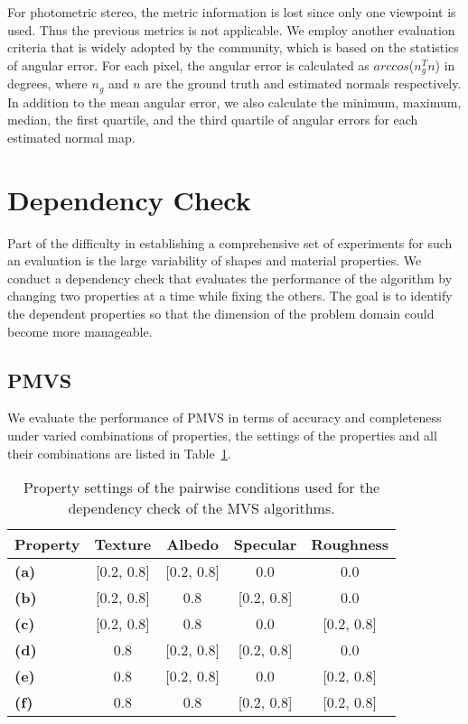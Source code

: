 For photometric stereo, the metric information is lost since only one viewpoint is used. Thus the previous metrics is not applicable. We employ another evaluation criteria that is widely adopted by the community, which is based on the statistics of angular error. For each pixel, the angular error is calculated as $arccos$($n_g^T n$) in degrees, where $n_g$ and $n$ are the ground truth and estimated normals respectively. In addition to the mean angular error, we also calculate the minimum, maximum, median, the first quartile, and the third quartile of angular errors for each estimated normal map.

\section{Dependency Check}
Part of the difficulty in establishing a comprehensive set of experiments for such an evaluation is the large variability of shapes and material properties. We conduct a dependency check that evaluates the performance of the algorithm by changing two properties at a time while fixing the others. The goal is to identify the dependent properties so that the dimension of the problem domain could become more manageable.

\subsection{PMVS}
We evaluate the performance of PMVS in terms of accuracy and completeness under varied combinations of properties, the settings of the properties and all their combinations are listed in Table~\ref{tab:mvs_depend_check_params}.
\begin{table}[!htbp]
  \centering
  \begin{tabular}{l*{4}{c}}
  \hline
  \textbf{Property} & Texture & Albedo & Specular & Roughness\\
  \hline
  \textbf{(a)} & [0.2, 0.8] & [0.2, 0.8] & 0.0 & 0.0\\
  \textbf{(b)} & [0.2, 0.8] & 0.8 & [0.2, 0.8] & 0.0\\
  \textbf{(c)} & [0.2, 0.8] & 0.8 & 0.0 & [0.2, 0.8]\\
  \textbf{(d)} & 0.8 & [0.2, 0.8] & [0.2, 0.8] & 0.0\\
  \textbf{(e)} & 0.8 & [0.2, 0.8] & 0.0 & [0.2, 0.8]\\
  \textbf{(f)} & 0.8 & 0.8 & [0.2, 0.8] & [0.2, 0.8]\\
  \hline
  \end{tabular}
  \caption{Property settings of the pairwise conditions used for the dependency check of the MVS algorithms.}
  \label{tab:mvs_depend_check_params}
\end{table}

